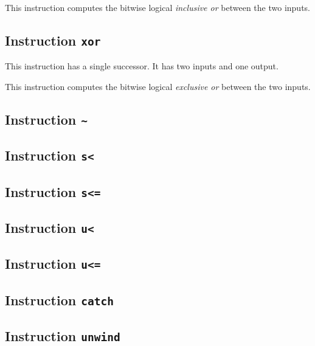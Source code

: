 This instruction computes the bitwise logical \emph{inclusive or}
between the two inputs.

\subsection{Instruction \texttt{xor}}
\label{mir-instruction-xor}

This instruction has a single successor.  It has two inputs and one
output. 

This instruction computes the bitwise logical \emph{exclusive or}
between the two inputs.

\subsection{Instruction \texttt{\~}}
\label{mir-instruction-not}

\subsection{Instruction \texttt{s<}}
\label{mir-instruction-s-less}

\subsection{Instruction \texttt{s<=}}
\label{mir-instruction-s-less-or-equal}

\subsection{Instruction \texttt{u<}}
\label{mir-instruction-u-less}

\subsection{Instruction \texttt{u<=}}
\label{mir-instruction-u-less-or-equal}

\subsection{Instruction \texttt{catch}}
\label{mir-instruction-catch}

\subsection{Instruction \texttt{unwind}}
\label{mir-instruction-unwind}
